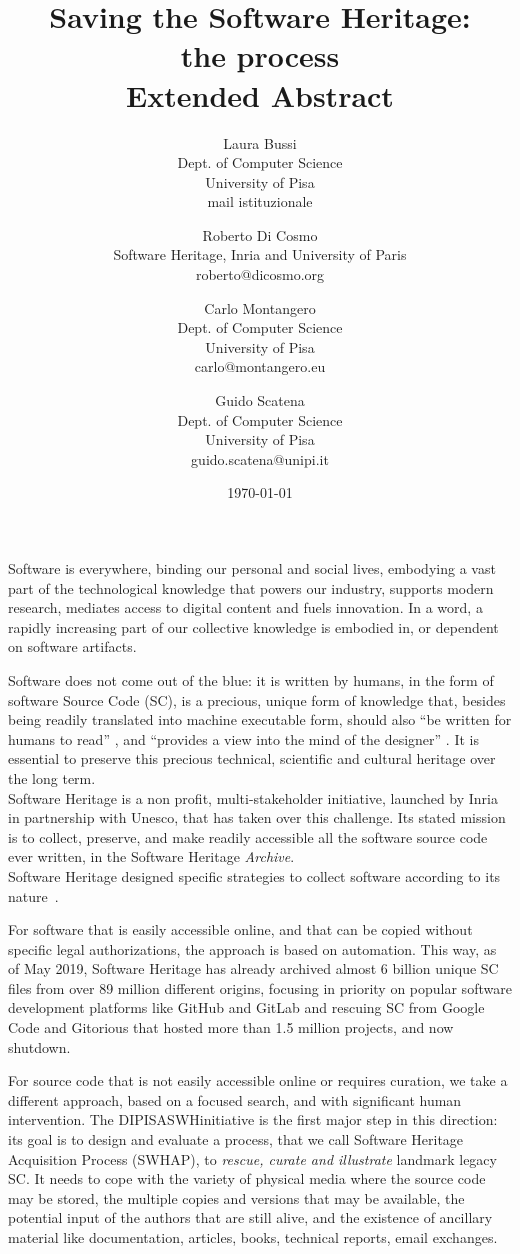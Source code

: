 \documentclass[a4paper]{article}
\title{Saving the Software Heritage:
				\\ the process  
				\\ 	\large Extended Abstract
}
\author{
    Laura Bussi\\
    Dept. of Computer Science\\
    University of Pisa\\
    mail istituzionale
	\and
    Roberto Di Cosmo\\
    Software Heritage, Inria and University of Paris\\
    roberto@dicosmo.org
  \and
    Carlo Montangero\\
    Dept. of Computer Science\\
    University of Pisa\\
    carlo@montangero.eu
  \and
    Guido Scatena\\
		Dept. of Computer Science\\
    University of Pisa\\
    guido.scatena@unipi.it
}
\date{\today}
\newcommand{\DIPISASWHinitiative}{DIPISASWHinitiative }
\begin{document}
\maketitle


\noindent              
Software is everywhere,  binding our personal and social lives, embodying a vast part of the technological knowledge that powers our industry, supports modern research, mediates access to digital content and fuels innovation. In a word, a rapidly increasing part of our collective knowledge is embodied in, or dependent on software artifacts. 

Software does not come out of the blue: it is written by humans, in the form of software Source Code (SC), is a precious, unique form of knowledge that, besides being readily translated into machine executable form, should also "`be written for humans to read"' \cite{AbelsonS85}, and "`provides a view into the mind of the designer"' \cite{Shustek06}. It is essential to preserve this precious technical, scientific and cultural heritage over the long term.\\

\noindent
Software Heritage is a non profit, multi-stakeholder initiative, launched by Inria in partnership with Unesco, that has taken over this challenge. Its stated mission is to collect, preserve, and make readily accessible all the software source code ever written, in the Software Heritage \emph{Archive}.\\

Software Heritage designed specific strategies to collect software according to its nature~\cite{swhcacm2018}. 

For software that is easily accessible online, and that can be copied without specific legal authorizations, the approach is based on automation. This way, as of May 2019, Software Heritage has already archived almost 6 billion unique SC files from over 89 million different origins, focusing in priority on popular software development platforms like GitHub and GitLab and rescuing SC from Google Code and Gitorious that hosted more than 1.5 million projects, and now shutdown.

For source code that is not easily accessible online or requires curation, we take a different approach, based on a focused search, and with significant human intervention. The \DIPISASWHinitiative is the first major step in this direction: its goal is to design and evaluate a process, that we call Software Heritage Acquisition Process (SWHAP), to \emph{rescue, curate and illustrate} landmark legacy SC. It needs to cope with the variety of physical media where the source code may be stored, the multiple copies and versions that may be available, the potential input of the authors that are still alive, and the existence of ancillary material like documentation, articles, books, technical reports, email exchanges.\\
\end{document}
